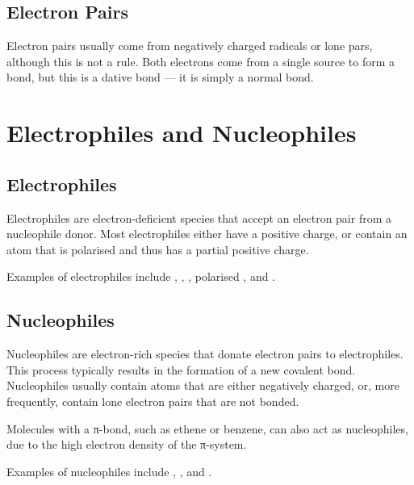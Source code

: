 

		\subsection{Electron Pairs}

			Electron pairs usually come from negatively charged radicals or lone pars, although this is not a rule.
			Both electrons come from a single source to form a bond, but this is  a dative bond --- it is simply a normal
			bond.




	\pagebreak
	\section{Electrophiles and Nucleophiles}
		\subsection{Electrophiles}

			Electrophiles are electron-deficient species that accept an electron pair from a nucleophile donor. Most electrophiles
			either have a positive charge, or contain an atom that is polarised and thus has a partial positive charge.

			Examples of electrophiles include , , , polarised , and .


		\subsection{Nucleophiles}

			Nucleophiles are electron-rich species that donate electron pairs to electrophiles. This process typically results
			in the formation of a new covalent bond. Nucleophiles usually contain atoms that are either negatively charged, or,
			more frequently, contain lone electron pairs that are not bonded.

			Molecules with a π-bond, such as ethene or benzene, can also act as nucleophiles, due to the high electron
			density of the π-system.

			Examples of nucleophiles include , , and .


















